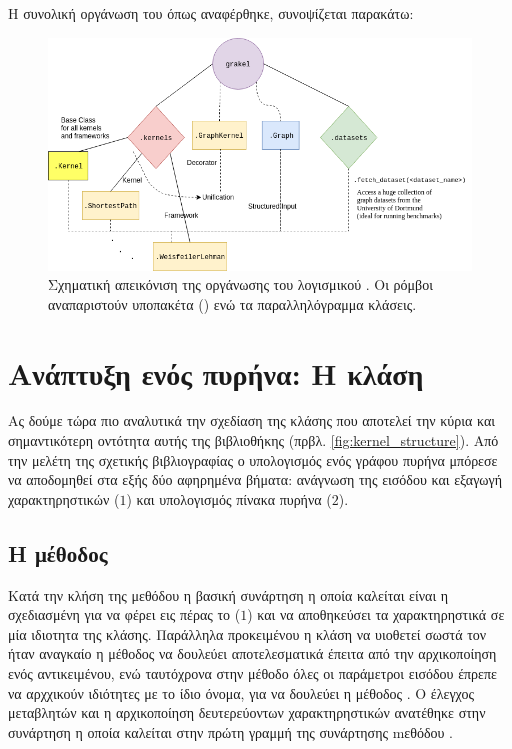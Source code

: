 H συνολική οργάνωση του  όπως αναφέρθηκε, συνοψίζεται παρακάτω:
\begin{figure}[h]
    \centering
    \includegraphics[width=\textwidth]{figures/grakel-schema}
    \caption{Σχηματική απεικόνιση της οργάνωσης του λογισμικού . Οι ρόμβοι αναπαριστούν υποπακέτα () ενώ τα παραλληλόγραμμα κλάσεις.}
    \label{fig:grakel}
\end{figure}
\section{Ανάπτυξη ενός πυρήνα: Η κλάση }
Ας δούμε τώρα πιο αναλυτικά την σχεδίαση της κλάσης  που αποτελεί την κύρια και σημαντικότερη οντότητα αυτής της βιβλιοθήκης (πρβλ. \ref{fig:kernel_structure}).
Από την μελέτη της σχετικής βιβλιογραφίας ο υπολογισμός ενός γράφου πυρήνα μπόρεσε να αποδομηθεί στα εξής δύο αφηρημένα βήματα: ανάγνωση της εισόδου και εξαγωγή χαρακτηρηστικών ($1$) και υπολογισμός πίνακα πυρήνα ($2$).
\subsection{Η μέθοδος \texttt{}}
Κατά την κλήση της μεθόδου \texttt{} η βασική συνάρτηση η οποία καλείται είναι η \texttt{} σχεδιασμένη για να φέρει εις πέρας το ($1$) και να αποθηκεύσει τα χαρακτηρηστικά σε μία ιδιοτητα της κλάσης.
Παράλληλα προκειμένου η κλάση  να υιοθετεί σωστά τον  ήταν αναγκαίο η μέθοδος  να δουλεύει αποτελεσματικά έπειτα από την αρχικοποίηση ενός αντικειμένου, ενώ ταυτόχρονα στην μέθοδο   όλες οι παράμετροι εισόδου έπρεπε να αρχχικούν ιδιότητες με το ίδιο όνομα, για να δουλεύει η μέθοδος .
Ο έλεγχος μεταβλητών και η αρχικοποίηση δευτερεύοντων χαρακτηρηστικών ανατέθηκε στην συνάρτηση \texttt{} η οποία καλείται στην πρώτη γραμμή της συνάρτησης mεθόδου \texttt{}.

